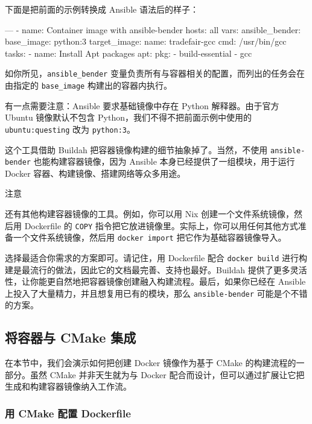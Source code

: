 下面是把前面的示例转换成 Ansible 语法后的样子：

\begin{codebox}[yaml]
---
- name: Container image with ansible-bender
  hosts: all
  vars:
    ansible_bender:
      base_image: python:3
      target_image:
        name: tradefair-gcc
        cmd: /usr/bin/gcc
  tasks:
  - name: Install Apt packages
    apt:
      pkg:
        - build-essential
        - gcc
\end{codebox}

如你所见，\texttt{ansible\_\allowbreak{}bender} 变量负责所有与容器相关的配置，而列出的任务会在由指定的 \texttt{base\_\allowbreak{}image} 构建出的容器内执行。

有一点需要注意：Ansible 要求基础镜像中存在 Python 解释器。由于官方 Ubuntu 镜像默认不包含 Python，我们不得不把前面示例中使用的 \texttt{ubuntu:questing} 改为 \texttt{python:3}。

这个工具借助 Buildah 把容器镜像构建的细节抽象掉了。当然，不使用 \texttt{ansible-bender} 也能构建容器镜像，因为 Ansible 本身已经提供了一组模块，用于运行 Docker 容器、构建镜像、搭建网络等众多用途。

\begin{myNotic}{注意}

还有其他构建容器镜像的工具。例如，你可以用 Nix 创建一个文件系统镜像，然后用 Dockerfile 的 \texttt{COPY} 指令把它放进镜像里。实际上，你可以用任何其他方式准备一个文件系统镜像，然后用 \texttt{docker import} 把它作为基础容器镜像导入。
\end{myNotic}

\label{idx:1777}
\label{idx:1778}
\label{idx:1779}
选择最适合你需求的方案即可。请记住，用 Dockerfile 配合 \texttt{docker build} 进行构建是最流行的做法，因此它的文档最完善、支持也最好。Buildah 提供了更多灵活性，让你能更自然地把容器镜像创建融入构建流程。最后，如果你已经在 Ansible 上投入了大量精力，并且想复用已有的模块，那么 \texttt{ansible-bender} 可能是个不错的方案。

\subsection{将容器与 CMake 集成}

\label{idx:1780}
\label{idx:1781}
在本节中，我们会演示如何把创建 Docker 镜像作为基于 CMake 的构建流程的一部分。虽然 CMake 并非天生就为与 Docker 配合而设计，但可以通过扩展让它把生成和构建容器镜像纳入工作流。

\subsubsection{用 CMake 配置 Dockerfile}

